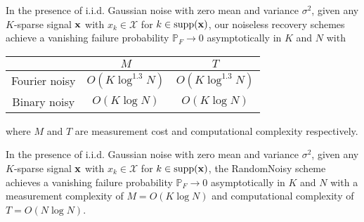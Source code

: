 

\begin{theorem}\label{thm:li2} In the presence of i.i.d. Gaussian noise with zero mean and
variance $\sigma^2$, given any $K$-sparse signal $\mathbf{x}$ with $x_k \in \mathcal{X}$ for $k \in \text{supp}(\mathbf{x})$, our noiseless recovery schemes achieve a vanishing failure probability $\mathbb{P}_F \rightarrow 0$ asymptotically in $K$ and $N$ with
\begin{center}\small
\begin{tabular}{|c|c|c|}
  \hline
   & $M$ &  $T$ \\
  \hline
  Fourier noisy & $O(K \log^{1.3}N)$ & $O(K \log^{1.3}N)$ \\
  \hline
  Binary noisy & $O(K \log N)$ & $O(K \log N)$ \\
  \hline
\end{tabular}
\end{center}
where $M$ and $T$ are measurement cost and computational complexity respectively.
\end{theorem}
\vspace{2ex}

\begin{theorem}\label{thm:li3} In the presence of i.i.d. Gaussian noise with zero mean and
variance $\sigma^2$, given any $K$-sparse signal $\mathbf{x}$ with $x_k \in \mathcal{X}$ for $k \in \text{supp}(\mathbf{x})$, the RandomNoisy scheme achieves a vanishing failure probability $\mathbb{P}_F \rightarrow 0$ asymptotically in $K$ and $N$ with a measurement complexity of $M = O(K \log N)$ and computational complexity of $T = O(N \log N)$.
\end{theorem}


